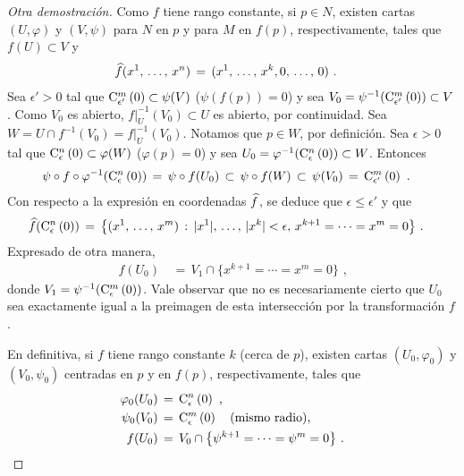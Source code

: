\begin{proof}[Otra demostraci\'{o}n]
	Como $f$ tiene rango constante, si $p\in N$, existen cartas
	$(U,\varphi)$ y $(V,\psi)$ para $N$ en $p$ y para $M$ en $f(p)$,
	respectivamente, tales que $f(U)\subset V$ y
	\begin{align*}
		\encoordenadas{f}(\lista*{x}{n}) & \,=\,
			(\lista*{x}{k},0,\,\dots,\,0)
		\text{ .}
	\end{align*}
	Sea $\epsilon'>0$ tal que $\cubo[m]{\epsilon'}{0}\subset\psi(V)$
	($\psi(f(p))=0$) y sea
	$V_0=\psi^{-1}(\cubo[m]{\epsilon'}{0})\subset V$. Como $V_0$ es
	abierto, $f|_U^{-1}(V_0)\subset U$ es abierto, por continuidad. Sea
	$W=U\cap f^{-1}(V_0)=f|_U^{-1}(V_0)$. Notamos que $p\in W$, por
	definici\'{o}n. Sea $\epsilon>0$ tal que
	$\cubo[n]{\epsilon}{0}\subset\varphi(W)$ ($\varphi(p)=0$) y sea
	$U_0=\varphi^{-1}(\cubo[n]{\epsilon}{0})\subset W$. Entonces
	\begin{align*}
		\psi\circ f\circ\varphi^{-1}(\cubo[n]{\epsilon}{0}) & \,=\,
			\psi\circ f(U_0) \,\subset\,\psi\circ f(W)\,\subset\,
			\psi(V_0)\,=\,\cubo[m]{\epsilon'}{0}
		\text{ .}
	\end{align*}
	Con respecto a la expresi\'{o}n en coordenadas $\encoordenadas{f}$, se
	deduce que $\epsilon\leq\epsilon'$ y que
	\begin{align*}
		\encoordenadas{f}(\cubo[n]{\epsilon}{0}) & \,=\,
			\big\{(\lista*{x}{m})\,:\,
				|x^1|,\,\dots,\,|x^k|<\epsilon,\,
				x^{k+1}=\cdots=x^m=0
				\big\}
		\text{ .}
	\end{align*}
	Expresado de otra manera,
	\begin{align*}
		f(U_0) & \,=\,V_1\cap \big\{x^{k+1}=\cdots=x^m=0\big\}
		\text{ ,}
	\end{align*}
	donde $V_1=\psi^{-1}(\cubo[m]{\epsilon}{0})$. Vale observar que no
	es necesariamente cierto que $U_0$ sea exactamente igual a la preimagen
	de esta intersecci\'{o}n por la transformaci\'{o}n $f$.

	En definitiva, si $f$ tiene rango constante $k$ (cerca de $p$), existen
	cartas $(U_0,\varphi_0)$ y $(V_0,\psi_0)$ centradas en $p$ y en $f(p)$,
	respectivamente, tales que
	\begin{align*}
		\varphi_0(U_0) & \,=\,\cubo[n]{\epsilon}{0} \text{ ,} \\
		\psi_0(V_0) & \,=\,\cubo[m]{\epsilon}{0}
			\quad\text{(mismo radio),} \\
		f(U_0) & \,=\,V_0\cap\big\{\psi^{k+1}=\cdots=\psi^m=0\big\}
		\text{ .}
	\end{align*}
\end{proof}

